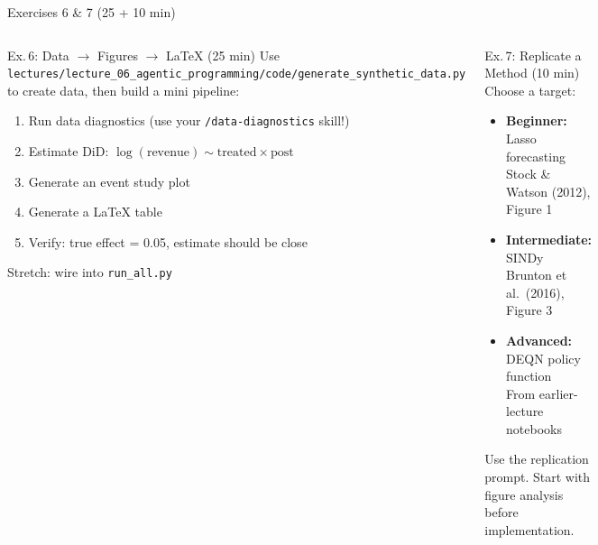 \documentclass[aspectratio=169,10pt]{beamer}
\begin{document}
\begin{frame}[fragile]{Exercises 6 \& 7 {\small(25 + 10 min)}}
\begin{columns}[T]
\begin{exampleblock}{Ex.\,6: Data $\to$ Figures $\to$ LaTeX (25 min)}
\small
Use \texttt{lectures/lecture\_06\_agentic\_programming/code/generate\_synthetic\_data.py} to create data, then build a mini pipeline:
\begin{enumerate}\itemsep0pt
    \item Run data diagnostics (use your \texttt{/data-diagnostics} skill!)
    \item Estimate DiD: $\log(\text{revenue}) \sim \text{treated} \times \text{post}$
    \item Generate an event study plot
    \item Generate a LaTeX table
    \item Verify: true effect = 0.05, estimate should be close
\end{enumerate}

{\scriptsize Stretch: wire into \texttt{run\_all.py}}
\end{exampleblock}

\begin{exampleblock}{Ex.\,7: Replicate a Method (10 min)}
\small
Choose a target:
\begin{itemize}\itemsep0pt
    \item \textbf{Beginner:} Lasso forecasting\\[-2pt]
    {\scriptsize Stock \& Watson (2012), Figure 1}
    \item \textbf{Intermediate:} SINDy\\[-2pt]
    {\scriptsize Brunton et al.\ (2016), Figure 3}
    \item \textbf{Advanced:} DEQN policy function\\[-2pt]
    {\scriptsize From earlier-lecture notebooks}
\end{itemize}

\vspace{0.2em}
Use the replication prompt. Start with figure analysis before implementation.
\end{exampleblock}
\end{columns}
\end{frame}

\end{document}
